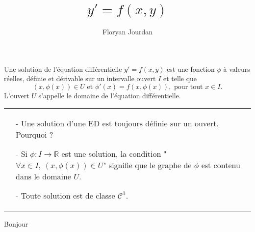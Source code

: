 \documentclass[12pt,a4paper]{article}
\title{$y' = f(x,y)$}
\author{Floryan Jourdan}
\newenvironment{commentaire}{\par\medskip\noindent\begin{tabular}{l|p{\linewidth-0.955cm}}
\ding{46} & }
{\end{tabular}\par\medskip}
\newcommand{\R}{\mathbb{R}}
\newcommand{\Cc}{\mathcal{C}}
\begin{document}
\maketitle

\begin{deff}
Une solution de l'équation différentielle $y' = f(x,y)$ est une fonction $\phi$ à valeurs réelles, définie et dérivable sur un intervalle ouvert $I$ et telle que 
$$(x,\phi(x)) \in U \text{ et } \phi'(x) = f(x, \phi(x)), \text{ pour tout } x \in I.$$
L'ouvert $U$ s'appelle le domaine de l'équation différentielle.
\end{deff}

\begin{commentaire}
 - Une solution d'une ED est toujours définie sur un ouvert. Pourquoi ?

 - Si $\phi : I \to \R$ est une solution, la condition "$\forall x \in I, ~ (x,\phi(x)) \in U$" signifie que le graphe de $\phi$ est contenu dans le domaine $U$.

 - Toute solution est de classe $\Cc^1$.
\end{commentaire}

Bonjour
\end{document}
